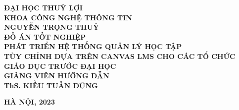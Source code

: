 \documentclass[main-report.tex]{subfiles}
\begin{document}
\begin{titlepage}
\thispagestyle{empty}
\thisfancypage{
\setlength{\fboxsep}{3pt}
\fbox}{} 
\begin{center}
{\bf\large ĐẠI HỌC THUỶ LỢI}\\
{\bf\subtitlesize KHOA CÔNG NGHỆ THÔNG TIN}\\[4cm]

{\bf\large NGUYỄN TRỌNG THUỶ}\\

{\bf\subtitlesize ĐỒ ÁN TỐT NGHIỆP}\\[0.5cm]
{\bf\LARGE PHÁT TRIỂN HỆ THỐNG QUẢN LÝ HỌC TẬP}\\
{\bf\LARGE TÙY CHỈNH DỰA TRÊN CANVAS LMS CHO CÁC TỔ CHỨC GIÁO DỤC TRƯỚC ĐẠI HỌC}\\[5cm]
{\bf GIẢNG VIÊN HƯỚNG DẪN}\\
{\bf ThS. KIỀU TUẤN DŨNG}
\end{center}

\vspace{4cm}
\begin{center}
{\bf HÀ NỘI, 2023}
\end{center}
\end{titlepage}
\end{document}
